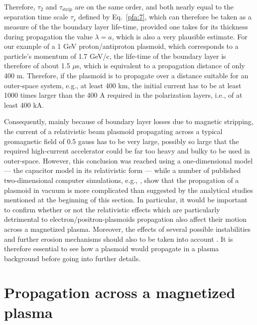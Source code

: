 \documentclass [12pt,a4paper,     ]{report} %
\begin{document}
  Therefore, $\tau_2$ and $\tau_{\text{strip}}$ are on the same order, and both nearly equal to the separation time scale $\tau_s$ defined by Eq.~\eqref{pfa:7}, which can therefore be taken as a measure of the the boundary layer life-time, provided one takes for its thickness during propagation the value $\lambda=a$, which is also a very plausible estimate.  For our example of a 1 GeV proton/antiproton plasmoid, which corresponds to a particle's momentum of 1.7 GeV/c, the life-time of the boundary layer is therefore of about 1.5 $\mu$s, which is equivalent to a propagation distance of only 400 m.  Therefore, if the plasmoid is to propagate over a distance suitable for an outer-space system, e.g., at least 400 km, the initial current has to be at least 1000 times larger than the 400 A required in the polarization layers, i.e., of at least 400 kA. 

   Consequently, mainly because of boundary layer losses due to magnetic stripping, the current of a relativistic beam plasmoid propagating across a typical geomagnetic field of 0.5 gauss has to be very large, possibly so large that the required high-current accelerator could be far too heavy and bulky to be used in outer-space.  However, this conclusion was reached using a one-dimensional model --- the capacitor model in its relativistic form --- while a number of published two-dimensional computer simulations, e.g.,  \cite{GALVE1988-, GALVE1989A, GALVE1991-}, show that the propagation of a plasmoid in vacuum is more complicated than suggested by the analytical studies mentioned at the beginning of this section. In particular, it would be important to confirm whether or not the relativistic effects which are particularly detrimental to electron/positron-plasmoids propagation also affect their motion across a magnetized plasma.  Moreover, the effects of several possible instabilities and further erosion mechanisms should also to be taken into account \cite{PETER1983B, GALVE1986-, GALVE1988-, CAI-1992-}.  It is therefore essential to see how a plasmoid would propagate in a plasma background before going into further details.  


 
\section{Propagation across a magnetized plasma}
\label{pmp:0}
\end{document}
